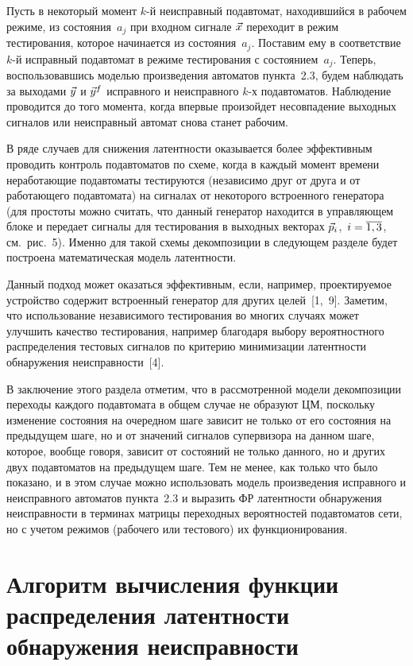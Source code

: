 \begin{multicols}{2}
Пусть в некоторый момент $k$-й неисправный подавтомат, находившийся в
рабочем режиме, из со\-сто\-яния~$a_j$ при входном сигнале $\vec x$
переходит в режим тестирования, которое начинается из со\-сто\-яния~$a_j$.
Поставим ему в соответствие $k$-й исправный подавтомат в режиме тестирования
с со\-сто\-янием~$a_j$.
Теперь, воспользовавшись моделью произведения автоматов пункта~2.3, будем
наблюдать за выходами $\vec y$ и $\vec y^f$ исправного и неисправного
$k$-х подавтоматов.
Наблюдение проводится до того момента, когда впервые произойдет
несовпадение выходных сигналов или неисправный автомат снова станет
рабочим.

В ряде случаев для снижения латентности оказывается более эффективным
проводить контроль подавтоматов по схеме, когда в каждый момент времени
неработающие подавтоматы тестируются (независимо друг от друга и от
работающего под\-ав\-то\-ма\-та) на сигналах от некоторого встроенного
генератора (для простоты можно считать, что данный генератор находится
в управляющем блоке и передает сигналы для тестирования в выходных
векторах $\vec p_i$,\ $i=\overline{1,3}$, см.\ рис.~5).
Именно для такой схемы декомпозиции в следующем разделе будет построена
математическая модель латентности.

Данный подход может оказаться эффективным, если, например, проектируемое
устройство содержит встроенный генератор для других целей~[1,~9].
Заметим, что использование независимого тестирования во многих случаях
может улучшить качество тестирования, например благодаря выбору
вероятностного распределения тестовых сигналов по критерию минимизации
латентности обнаружения неисправности~[4].

В заключение этого раздела отметим, что в рассмотренной модели
декомпозиции переходы каж\-до\-го подавтомата в общем случае не образуют
ЦМ, поскольку изменение состояния на очередном шаге зависит
не только от его состояния на предыду\-щем шаге, но и от значений сигналов
супервизора на данном шаге, которое, вообще говоря, зависит от состояний
не только данного, но и других двух под\-ав\-то\-ма\-тов на предыдущем шаге.
Тем не менее, как только что было показано, и в этом случае можно использовать
модель произведения исправного и неисправного автоматов пункта~2.3 и
выразить ФР латентности обнаружения неисправности в терминах матрицы
переходных вероятностей под\-ав\-то\-ма\-тов сети, но с учетом режимов
(рабочего или тестового) их функционирования.

\section{Алгоритм вычисления функции распределения латентности обнаружения
неисправности}


\end{multicols}
